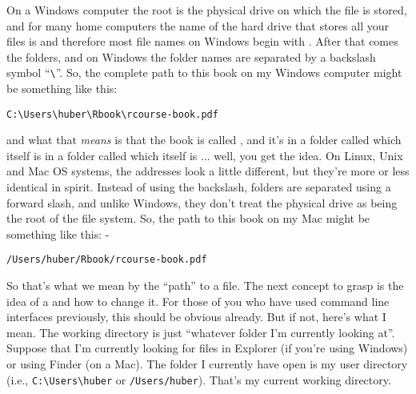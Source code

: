 On a Windows computer the root is the physical drive on which the file is stored, and for many home computers the name of the hard drive that stores all your files is  and therefore most file names on Windows begin with . After that comes the folders, and on Windows the folder names are separated by a backslash symbol ``\verb#\#''. So, the complete path to this book on my Windows computer might be something like this:
\begin{verbatim}
C:\Users\huber\Rbook\rcourse-book.pdf
\end{verbatim}
and what that {\it means} is that the book is called , and it's in a folder called  which itself is in a folder called  which itself is ... well, you get the idea. On Linux, Unix and Mac OS systems, the addresses look a little different, but they're more or less identical in spirit. Instead of using the backslash, folders are separated using a forward slash, and unlike Windows, they don't treat the physical drive as being the root of the file system. So, the path to this book on my Mac might be something like this:
-\begin{verbatim}
/Users/huber/Rbook/rcourse-book.pdf
\end{verbatim}

So that's what we mean by the ``path'' to a file. The next concept to grasp is the idea of a  and how to change it. For those of you who have used command line interfaces previously, this should be obvious already. But if not, here's what I mean. The working directory is just ``whatever folder I'm currently looking at''. Suppose that I'm currently looking for files in Explorer (if you're using Windows) or using Finder (on a Mac). The folder I currently have open is my user directory (i.e., \verb#C:\Users\huber# or \verb#/Users/huber#). That's my current working directory. 


